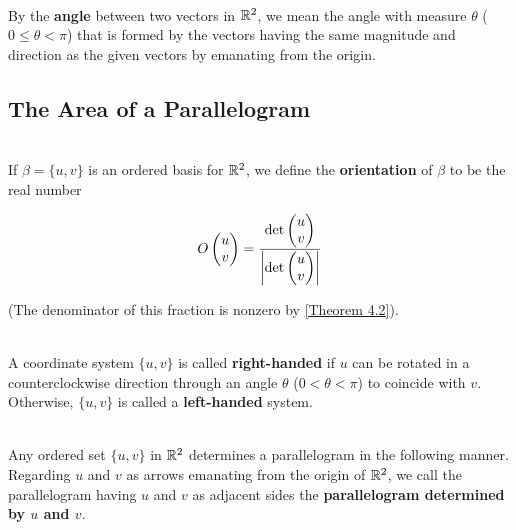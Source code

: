 \begin{definition}
	\hfill\\
	By the \textbf{angle} between two vectors in $\mathbb{R}^2$, we mean the angle with measure $\theta$ ($0 \leq \theta < \pi$) that is formed by the vectors having the same magnitude and direction as the given vectors by emanating from the origin.
\end{definition}

\subsection*{The Area of a Parallelogram}

\begin{definition}
	\hfill\\
	If $\beta = \{u,v\}$ is an ordered basis for $\mathbb{R}^2$, we define the \textbf{orientation} of $\beta$ to be the real number

	\[O\begin{pmatrix}
			u \\ v
		\end{pmatrix} = \frac{\det\begin{pmatrix}
				u \\ v
			\end{pmatrix}}{\left\lvert \det\begin{pmatrix}
					u \\ v
				\end{pmatrix} \right\rvert}\]

	(The denominator of this fraction is nonzero by \autoref{Theorem 4.2}).
\end{definition}

\begin{definition}
	\hfill\\
	A coordinate system $\{u, v\}$ is called \textbf{right-handed} if $u$ can be rotated in a counterclockwise direction through an angle $\theta$ ($0 < \theta < \pi$) to coincide with $v$. Otherwise, $\{u ,v\}$ is called a \textbf{left-handed} system.
\end{definition}

\begin{definition}
	\hfill\\
	Any ordered set $\{u, v\}$ in $\mathbb{R}^2$ determines a parallelogram in the following manner. Regarding $u$ and $v$ as arrows emanating from the origin of $\mathbb{R}^2$, we call the parallelogram having $u$ and $v$ as adjacent sides the \textbf{parallelogram determined by $u$ and $v$}.
\end{definition}
